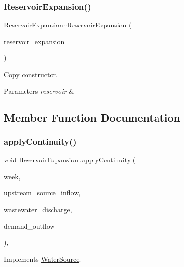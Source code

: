 \subsubsection{\texorpdfstring{Reservoir\+Expansion()}{ReservoirExpansion()}\hspace{0.1cm}{\footnotesize\ttfamily [2/2]}}
{\footnotesize\ttfamily Reservoir\+Expansion\+::\+Reservoir\+Expansion (\begin{DoxyParamCaption}\item[{const \mbox{\hyperlink{classReservoirExpansion}{Reservoir\+Expansion}} \&}]{reservoir\+\_\+expansion }\end{DoxyParamCaption})}

Copy constructor. 
\begin{DoxyParams}{Parameters}
{\em reservoir} & \\
\hline
\end{DoxyParams}


\subsection{Member Function Documentation}
\mbox{\label{classReservoirExpansion_a18614050354dced5cc2747eeda0c2397}} 
\subsubsection{\texorpdfstring{apply\+Continuity()}{applyContinuity()}}
{\footnotesize\ttfamily void Reservoir\+Expansion\+::apply\+Continuity (\begin{DoxyParamCaption}\item[{int}]{week,  }\item[{double}]{upstream\+\_\+source\+\_\+inflow,  }\item[{double}]{wastewater\+\_\+discharge,  }\item[{vector$<$ double $>$ \&}]{demand\+\_\+outflow }\end{DoxyParamCaption})\hspace{0.3cm}{\ttfamily [override]}, {\ttfamily [virtual]}}



Implements \mbox{\hyperlink{classWaterSource_ac070445379fe706f65b977dade4f3fbc}{Water\+Source}}.

\mbox{\label{classReservoirExpansion_af197058813986b16c34ae206c04e14bf}} 
